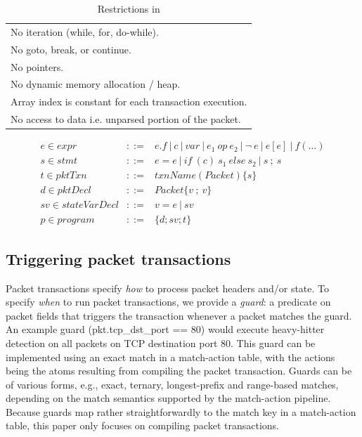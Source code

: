 \begin{table}
  \begin{tabular}{p{}}
    No iteration (while, for, do-while).\\
    No goto, break, or continue.\\
    No pointers.\\
    No dynamic memory allocation / heap.\\
    Array index is constant for each transaction execution.\\
    No access to data i.e. unparsed portion of the packet.\\
  \end{tabular}

\newcommand{\sep}{~|~}
\begin{eqnarray*}
e \in expr &::=& e.f \sep c \sep var \sep e_1~op~e_2 \sep \neg~e \sep e[e] \sep f(\ldots) \\
%
s \in stmt &::=& e = e \sep if~(c)~s_1~else~s_2 \sep s~;~s \\
%
t \in pktTxn &::=& txnName(Packet) \{ s \} \\
%
d \in pktDecl &::=& Packet \{ v~;~v \} \\
%
sv \in stateVarDecl &::=& v = e \sep sv \\
%
p \in program &::=& \{ d ; sv ; t \}
\end{eqnarray*}

  \caption{Restrictions in \pktlanguage}

  \label{tab:restrict}
\end{table}

\subsection{Triggering packet transactions}
\label{ss:guards}
Packet transactions specify \textit{how} to process packet headers and/or
state.  To specify {\em when} to run packet transactions, we provide a {\em
guard}: a predicate on packet fields that triggers the transaction whenever a
packet matches the guard. An example guard (pkt.tcp\_dst\_port == 80) would execute
heavy-hitter detection on all packets on TCP destination port 80. This guard can
be implemented using an exact match in a match-action table, with the actions
being the atoms resulting from compiling the packet transaction. Guards can be of various forms,
e.g., exact, ternary, longest-prefix and range-based matches, depending on the
match semantics supported by the match-action pipeline. Because guards map
rather straightforwardly to the match key in a match-action table, this paper only
focuses on compiling packet transactions.

